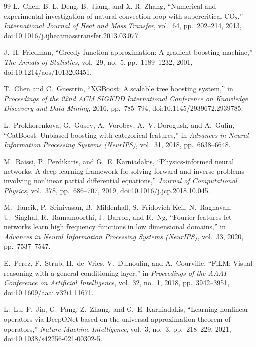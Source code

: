 \documentclass[11pt]{article}
\begin{document}
\begin{thebibliography}{99}
L.~Chen, B.-L. Deng, B.~Jiang, and X.-R. Zhang, ``Numerical and experimental investigation of natural convection loop with supercritical $\mathrm{CO}_2$,'' \emph{International Journal of Heat and Mass Transfer}, vol.~64, pp.~202--214, 2013, doi:10.1016/j.ijheatmasstransfer.2013.03.077.

J.~H. Friedman, ``Greedy function approximation: A gradient boosting machine,'' \emph{The Annals of Statistics}, vol.~29, no.~5, pp.~1189--1232, 2001, doi:10.1214/aos/1013203451.

T.~Chen and C.~Guestrin, ``XGBoost: A scalable tree boosting system,'' in \emph{Proceedings of the 22nd ACM SIGKDD International Conference on Knowledge Discovery and Data Mining}, 2016, pp.~785--794, doi:10.1145/2939672.2939785.

L.~Prokhorenkova, G.~Gusev, A.~Vorobev, A.~V. Dorogush, and A.~Gulin, ``CatBoost: Unbiased boosting with categorical features,'' in \emph{Advances in Neural Information Processing Systems (NeurIPS)}, vol.~31, 2018, pp.~6638--6648.

M.~Raissi, P.~Perdikaris, and G.~E. Karniadakis, ``Physics-informed neural networks: A deep learning framework for solving forward and inverse problems involving nonlinear partial differential equations,'' \emph{Journal of Computational Physics}, vol.~378, pp.~686--707, 2019, doi:10.1016/j.jcp.2018.10.045.

M.~Tancik, P.~Srinivasan, B.~Mildenhall, S.~Fridovich-Keil, N.~Raghavan, U.~Singhal, R.~Ramamoorthi, J.~Barron, and R.~Ng, ``Fourier features let networks learn high frequency functions in low dimensional domains,'' in \emph{Advances in Neural Information Processing Systems (NeurIPS)}, vol.~33, 2020, pp.~7537--7547.

E.~Perez, F.~Strub, H.~de~Vries, V.~Dumoulin, and A.~Courville, ``FiLM: Visual reasoning with a general conditioning layer,'' in \emph{Proceedings of the AAAI Conference on Artificial Intelligence}, vol.~32, no.~1, 2018, pp.~3942--3951, doi:10.1609/aaai.v32i1.11671.

L.~Lu, P.~Jin, G.~Pang, Z.~Zhang, and G.~E. Karniadakis, ``Learning nonlinear operators via DeepONet based on the universal approximation theorem of operators,'' \emph{Nature Machine Intelligence}, vol.~3, no.~3, pp.~218--229, 2021, doi:10.1038/s42256-021-00302-5.


\end{thebibliography}
\end{document}
